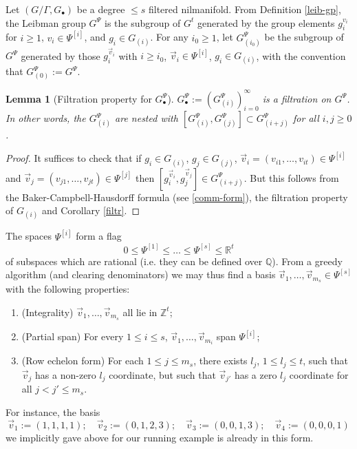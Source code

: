 \documentclass[11pt,reqno]{amsart}
\numberwithin{equation}{section}
\theoremstyle{plain}
\newtheorem{lemma}[subsection]{Lemma}
\theoremstyle{definition}
\renewcommand{\leq}{\leqslant}
\renewcommand{\geq}{\geqslant}
\newcommand\Z{\mathbb{Z}}
\newcommand\R{\mathbb{R}}
\newcommand\Q{\mathbb{Q}}
\newcommand\1{{\bf 1}}
\newcommand\2{{\bf 2}}
\begin{document}
Let $(G/\Gamma, G_\bullet)$ be a degree $\leq s$ filtered nilmanifold.
From Definition \ref{leib-gp}, the Leibman group $G^{\Psi}$ is the subgroup of $G^t$ generated by the group elements $g_i^{v_i}$ for $i \geq 1$, $v_i \in {\Psi}^{[i]}$, and $g_i \in G_{(i)}$.  For any $i_0 \geq 1$, let $G_{(i_0)}^{\Psi}$ be the subgroup of $G^{\Psi}$ generated by those $g_i^{\vec v_i}$ with $i \geq i_0$, $\vec v_i \in {\Psi}^{[i]}$, $g_i \in G_{(i)}$, with the convention that $G_{(0)}^{\Psi} := G^{\Psi}$.  

\begin{lemma}[Filtration property for $G_\bullet^\Psi$]\label{gij-lemma}
$G_\bullet^{\Psi} := (G_{(i)}^{\Psi})_{i=0}^\infty$ is a filtration on $G^{\Psi}$.   In other words, the $G_{(i)}^\Psi$ are nested with $[G_{(i)}^\Psi,G_{(j)}^\Psi] \subset G_{(i+j)}^\Psi$ for all $i, j\geq 0$.
\end{lemma}

\begin{proof} It suffices to check that if $g_i \in G_{(i)}$, $g_j \in G_{(j)}$, $\vec{v}_i = (v_{i1},\dots, v_{it}) \in \Psi^{[i]}$ and $\vec{v}_j = (v_{j1},\dots,v_{jt}) \in \Psi^{[j]}$ then $[g_i^{\vec{v}_i}, g_j^{\vec{v}_j}] \in G_{(i+j)}^{\Psi}$. But this follows from the Baker-Campbell-Hausdorff formula (see \eqref{comm-form}), the filtration property of $G_{(i)}$ and Corollary \ref{filtr}.\end{proof}

The spaces $\Psi^{[i]}$ form a flag
$$ 0 \leq \Psi^{[1]} \leq \ldots \leq \Psi^{[s]} \leq \R^t$$
of subspaces which are rational (i.e. they can be defined over $\Q$).  From a greedy algorithm (and clearing denominators) we may thus find a basis $\vec{v}_1,\ldots,\vec{v}_{m_s} \in \Psi^{[s]}$ with the following properties:
\begin{enumerate}
\item (Integrality) $\vec{v}_1,\ldots,\vec{v}_{m_s}$ all lie in $\Z^t$;
\item (Partial span) For every $1 \leq i \leq s$, $\vec{v}_1,\ldots,\vec{v}_{m_i}$ span $\Psi^{[i]}$;
\item (Row echelon form)  For each $1 \leq j \leq m_s$, there exists $l_j$, $1 \leq l_j \leq t$, such that $\vec{v}_j$ has a non-zero $l_j$ coordinate, but such that $\vec{v}_{j'}$ has a zero $l_j$ coordinate for all $j < j' \leq m_s$.
\end{enumerate}

For instance, the basis 
$$ \vec v_1 := (1,1,1,1); \quad \vec v_2 := (0,1,2,3); \quad \vec v_3 := (0,0,1,3); \quad \vec v_4 := (0,0,0,1)$$
we implicitly gave above for our running example is already in this form.
\end{document}
